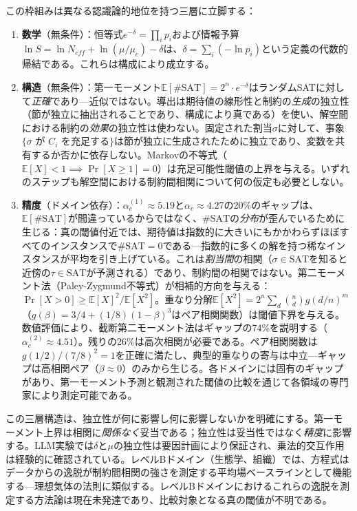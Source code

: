 \documentclass[11pt,a4paper]{article}
\begin{document}
この枠組みは異なる認識論的地位を持つ三層に立脚する：

\begin{enumerate}
    \item \textbf{数学}（無条件）：恒等式$e^{-\delta} = \prod_i p_i$および情報予算$\ln S = \ln N_{eff} + \ln(\mu/\mu_c) - \delta$は、$\delta = \sum_i (-\ln p_i)$という定義の代数的帰結である。これらは構成により成立する。

    \item \textbf{構造}（無条件）：第一モーメント$\mathbb{E}[\#\text{SAT}] = 2^n \cdot e^{-\delta}$はランダムSATに対して\emph{正確}であり---近似ではない。導出は期待値の線形性と制約の\emph{生成}の独立性（節が独立に抽出されることであり、構成により真である）を使い、解空間における制約の\emph{効果}の独立性は使わない。固定された割当$\sigma$に対して、事象$\{\sigma \text{ が } C_i \text{ を充足する}\}$は節が独立に生成されたために独立であり、変数を共有するか否かに依存しない。Markovの不等式（$\mathbb{E}[X] < 1 \implies \Pr[X \geq 1] = 0$）は充足可能性閾値の上界を与える。いずれのステップも解空間における制約間相関について何の仮定も必要としない。

    \item \textbf{精度}（ドメイン依存）：$\alpha_c^{(1)} \approx 5.19$と$\alpha_c \approx 4.27$の20\%のギャップは、$\mathbb{E}[\#\text{SAT}]$が間違っているからではなく、$\#\text{SAT}$の\emph{分布}が歪んでいるために生じる：真の閾値付近では、期待値は指数的に大きいにもかかわらずほぼすべてのインスタンスで$\#\text{SAT} = 0$である---指数的に多くの解を持つ稀なインスタンスが平均を引き上げている。これは\emph{割当間}の相関（$\sigma \in \text{SAT}$を知ると近傍の$\tau \in \text{SAT}$が予測される）であり、制約間の相関ではない。第二モーメント法（Paley-Zygmund不等式）が相補的方向を与える：$\Pr[X > 0] \geq \mathbb{E}[X]^2 / \mathbb{E}[X^2]$。重なり分解$\mathbb{E}[X^2] = 2^n \sum_d \binom{n}{d} g(d/n)^m$（$g(\beta) = 3/4 + (1/8)(1-\beta)^3$はペア相関関数）は閾値下界を与える。数値評価により、截断第二モーメント法はギャップの74\%を説明する（$\alpha_c^{(2)} \approx 4.51$）。残りの26\%は高次相関が必要である。ペア相関関数は$g(1/2)/(7/8)^2 = 1$を正確に満たし、典型的重なりの寄与は中立---ギャップは高相関ペア（$\beta \approx 0$）のみから生じる。各ドメインには固有のギャップがあり、第一モーメント予測と観測された閾値の比較を通じて各領域の専門家により測定可能である。
\end{enumerate}

\noindent この三層構造は、独立性が何に影響し何に影響しないかを明確にする。第一モーメント上界は相関に\emph{関係なく}妥当である；独立性は妥当性ではなく\emph{精度}に影響する。LLM実験では$\delta$と$\mu$の独立性は要因計画により保証され、乗法的交互作用は経験的に確認されている。レベルBドメイン（生態学、組織）では、方程式はデータからの逸脱が制約間相関の強さを測定する平均場ベースラインとして機能する---理想気体の法則に類似する。レベルBドメインにおけるこれらの逸脱を測定する方法論は現在未発達であり、比較対象となる真の閾値が不明である。
\end{document}

